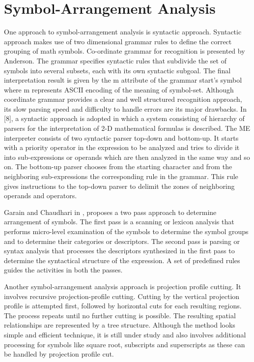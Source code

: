 \section{Symbol-Arrangement Analysis}
%

One approach to symbol-arrangement analysis is syntactic approach.
Syntactic approach makes use of two dimensional grammar rules to
define the correct grouping of math symbols. Co-ordinate grammar for
recognition is presented by Anderson. The grammar specifies
syntactic rules that subdivide the set of symbols into several
subsets, each with its own syntactic subgoal. The final
interpretation result is given by the m attribute of the grammar
start's symbol where m represents ASCII encoding of the meaning of
symbol-set. Although coordinate grammar provides a clear and well
structured recognition approach, its slow parsing speed and
difficulty to handle errors are its major drawbacks. In [8], a
syntactic approach is adopted in which a system consisting of
hierarchy of parsers for the interpretation of 2-D mathematical
formulas is described. The ME interpreter consists of two syntactic
parser top-down and bottom-up. It starts with a priority operator in
the expression to be analyzed and tries to divide it into
sub-expressions or operands which are then analyzed in the same way
and so on. The bottom-up parser chooses from the starting character
and from the neighboring sub-expressions the corresponding rule in
the grammar. This rule gives instructions to the top-down parser to
delimit the zones of neighboring operands and operators.

Garain and Chaudhari in \cite{garain2004roh}, proposes a two pass
approach to determine arrangement of symbols. The first pass is a
scanning or lexicon analysis that performs micro-level examination
of the symbols to determine the symbol groups and to determine their
categories or descriptors. The second pass is parsing or syntax
analysis that processes the descriptors synthesized in the first
pass to determine the syntactical structure of the expression. A set
of predefined rules guides the activities in both the passes.

Another symbol-arrangement analysis approach is projection profile
cutting. It involves recursive projection-profile cutting. Cutting
by the vertical projection profile is attempted first, followed by
horizontal cuts for each resulting regions. The process repeats
until no further cutting is possible. The resulting spatial
relationships are represented by a tree structure.  Although the
method looks simple and efficient technique, it is still under study
and also involves additional processing for symbols like square
root, subscripts and superscripts as these can be handled by
projection profile cut.

